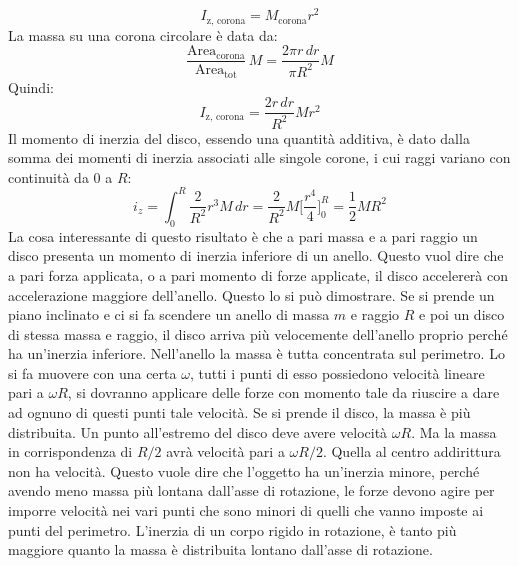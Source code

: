\documentclass[10pt,a4paper]{book}
\begin{document}
\[
	I_\text{z, corona}=M_\text{corona}r^2
\]
La massa su una corona circolare è data da:
\[
	\frac{\text{Area}_\text{corona}}{\text{Area}_\text{tot}}\, M=\frac{2\pi r\,dr}{\pi R^2} M
\]
Quindi:
\[
	I_\text{z, corona}=\frac{2 r\,dr}{R^2}M r^2
\]
Il momento di inerzia del disco, essendo una quantità additiva, è dato dalla somma dei momenti di inerzia associati alle singole corone, i cui raggi variano con continuità da 0 a $R$:
\[
	i_z=\int_0^R \frac{2}{R^2}r^3M\,dr=\frac{2}{R^2}M\biggl[\frac{r^4}{4} \biggr]_0^R=\frac{1}{2}MR^2
\]
La cosa interessante di questo risultato è che a pari massa e a pari raggio un disco presenta un momento di inerzia inferiore di un anello. Questo vuol dire che a pari forza applicata, o a pari momento di forze applicate, il disco accelererà con accelerazione maggiore dell'anello. Questo lo si può dimostrare. Se si prende un piano inclinato e ci si fa scendere un anello di massa $m$ e raggio $R$ e poi un disco di stessa massa e raggio, il disco arriva più velocemente dell'anello proprio perché ha un'inerzia inferiore.
Nell'anello la massa è tutta concentrata sul perimetro. Lo si fa muovere con una certa $\omega$, tutti i punti di esso possiedono velocità lineare pari a $\omega R$, si dovranno applicare delle forze con momento tale da riuscire a dare ad ognuno di questi punti tale velocità. Se si prende il disco, la massa è più distribuita.  Un punto all'estremo del disco deve avere velocità $\omega R$. Ma la massa in corrispondenza di $R/2$ avrà velocità pari a $\omega R/2$. Quella al centro addirittura non ha velocità. Questo vuole dire che l'oggetto ha un'inerzia minore, perché avendo meno massa più lontana dall'asse di rotazione, le forze devono agire per imporre velocità nei vari punti che sono minori di quelli che vanno imposte ai punti del perimetro. L'inerzia di un corpo rigido in rotazione, è tanto più maggiore quanto la massa è distribuita lontano dall'asse di rotazione.
\end{document}
